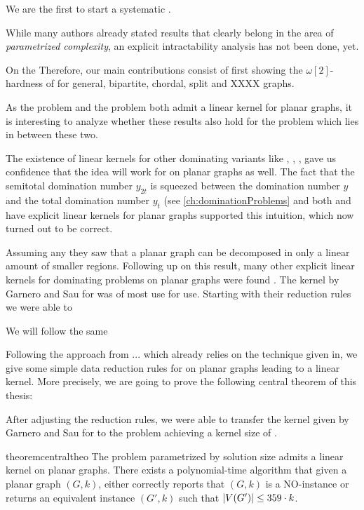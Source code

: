 We are the first to start a systematic .

While many authors already stated results that clearly belong in the area of \textit{parametrized complexity}, an explicit intractability analysis has not been done, yet.


On the Therefore, our main contributions consist of first showing the $\omega[2]$-hardness of \sdom for general, bipartite, chordal, split and XXXX graphs.


As the \dom problem and the \tdom problem both admit a linear kernel for planar graphs, it is interesting to analyze whether these results also hold for the \sdom problem which lies in between these two. 

The existence of linear kernels for other dominating variants like \eddom, \efdom, \cdom, \rbdom gave us confidence that the idea will work for \sdom on planar graphs as well. The fact that the semitotal domination number $y_{2t}$ is squeezed between the domination number $y$ and the total domination number $y_t$ (see \cref{ch:dominationProblems} and both \dom and \dom have explicit linear kernels for planar graphs supported this intuition, which now turned out to be correct.


Assuming any \dom they saw that a planar graph can be decomposed in only a linear amount of smaller regions.
Following up on this result, many other explicit linear kernels for dominating problems on planar graphs were found \cite{Guo2007, Garnero2017, Luo2013, Alber2006}. The kernel by Garnero and Sau \cite{Garnero2018} for \ptdom was of most use for use. Starting with their reduction rules we were able to 

We will follow the same 

Following the approach from ... which already relies on the technique given in, we give some simple data reduction rules for \sdom on planar graphs leading to a linear kernel. More precisely, we are going to prove the following central theorem of this thesis:

After adjusting the reduction rules, we were able to transfer the kernel given by Garnero and Sau \cite{Garnero2018} for \pdom to the \psdom problem achieving a kernel size of . 

\begin{restatable}[]{theorem}{centraltheo}\label{thm:central}
    The \sdom problem parametrized by solution size admits a linear kernel on planar graphs. There exists a polynomial-time algorithm that given a planar graph $(G, k)$, either correctly reports that $(G, k)$ is a NO-instance or returns an equivalent instance $(G', k)$ such that $\abs{V(G')} \leq 359 \cdot k$.
\end{restatable}

